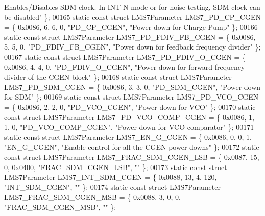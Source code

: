 \begin{DoxyCode}
{      Enables/Disables SDM clock. In INT-N mode or for noise testing, SDM clock can be disabled"} \};
00165 \textcolor{keyword}{static} \textcolor{keyword}{const} \textcolor{keyword}{struct }LMS7Parameter LMS7_PD_CP_CGEN = \{ 0x0086, 6, 6, 0, \textcolor{stringliteral}{"PD\_CP\_CGEN"}, \textcolor{stringliteral}{"Power down for Charge
       Pump"} \};
00166 \textcolor{keyword}{static} \textcolor{keyword}{const} \textcolor{keyword}{struct }LMS7Parameter LMS7_PD_FDIV_FB_CGEN = \{ 0x0086, 5, 5, 0, \textcolor{stringliteral}{"PD\_FDIV\_FB\_CGEN"}, \textcolor{stringliteral}{"Power down
       for feedback frequency divider"} \};
00167 \textcolor{keyword}{static} \textcolor{keyword}{const} \textcolor{keyword}{struct }LMS7Parameter LMS7_PD_FDIV_O_CGEN = \{ 0x0086, 4, 4, 0, \textcolor{stringliteral}{"PD\_FDIV\_O\_CGEN"}, \textcolor{stringliteral}{"Power down
       for forward frequency divider of the CGEN block"} \};
00168 \textcolor{keyword}{static} \textcolor{keyword}{const} \textcolor{keyword}{struct }LMS7Parameter LMS7_PD_SDM_CGEN = \{ 0x0086, 3, 3, 0, \textcolor{stringliteral}{"PD\_SDM\_CGEN"}, \textcolor{stringliteral}{"Power down for SDM"}
       \};
00169 \textcolor{keyword}{static} \textcolor{keyword}{const} \textcolor{keyword}{struct }LMS7Parameter LMS7_PD_VCO_CGEN = \{ 0x0086, 2, 2, 0, \textcolor{stringliteral}{"PD\_VCO\_CGEN"}, \textcolor{stringliteral}{"Power down for VCO"}
       \};
00170 \textcolor{keyword}{static} \textcolor{keyword}{const} \textcolor{keyword}{struct }LMS7Parameter LMS7_PD_VCO_COMP_CGEN = \{ 0x0086, 1, 1, 0, \textcolor{stringliteral}{"PD\_VCO\_COMP\_CGEN"}, \textcolor{stringliteral}{"Power
       down for VCO comparator"} \};
00171 \textcolor{keyword}{static} \textcolor{keyword}{const} \textcolor{keyword}{struct }LMS7Parameter LMS7_EN_G_CGEN = \{ 0x0086, 0, 0, 1, \textcolor{stringliteral}{"EN\_G\_CGEN"}, \textcolor{stringliteral}{"Enable control for all
       the CGEN power downs"} \};
00172 \textcolor{keyword}{static} \textcolor{keyword}{const} \textcolor{keyword}{struct }LMS7Parameter LMS7_FRAC_SDM_CGEN_LSB = \{ 0x0087, 15, 0, 0x0400, \textcolor{stringliteral}{"FRAC\_SDM\_CGEN\_LSB"}, \textcolor{stringliteral}{""}
       \};
00173 \textcolor{keyword}{static} \textcolor{keyword}{const} \textcolor{keyword}{struct }LMS7Parameter LMS7_INT_SDM_CGEN = \{ 0x0088, 13, 4, 120, \textcolor{stringliteral}{"INT\_SDM\_CGEN"}, \textcolor{stringliteral}{""} \};
00174 \textcolor{keyword}{static} \textcolor{keyword}{const} \textcolor{keyword}{struct }LMS7Parameter LMS7_FRAC_SDM_CGEN_MSB = \{ 0x0088, 3, 0, 0, \textcolor{stringliteral}{"FRAC\_SDM\_CGEN\_MSB"}, \textcolor{stringliteral}{""} \};

\end{DoxyCode}
